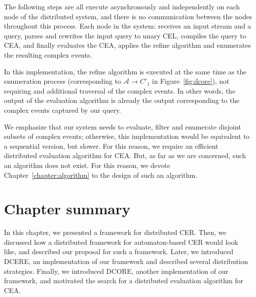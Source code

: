 The following steps are all execute asynchronously and independently on each node of the distributed system, and there is no communication between the nodes throughout this process. Each node in the system: receives an input stream and a query, parses and rewrites the input query to unary CEL, compiles the query to CEA, and finally evaluates the CEA, applies the refine algorithm and enumerates the resulting complex events.

In this implementation, the refine algorithm is executed at the same time as the enumeration process (corresponding to $\mathcal{A} \to C'_{1}$ in Figure~\ref{fig:dcore}), not requiring and additional traversal of the complex events. In other words, the output of the evaluation algorithm is already the output corresponding to the complex events captured by our query.

We emphasize that our system needs to evaluate, filter and enumerate disjoint subsets of complex events; otherwise, this implementation would be equivalent to a sequential version, but slower. For this reason, we require an efficient distributed evaluation algorithm for CEA. But, as far as we are concerned, such an algorithm does not exist. For this reason, we devote Chapter~\ref{chapter:algorithm} to the design of such an algorithm.

\section{Chapter summary}

In this chapter, we presented a framework for distributed CER. Then, we discussed how a distributed framework for automaton-based CER would look like, and described our proposal for such a framework. Later, we introduced DCERE, an implementation of our framework and described several distribution strategies. Finally, we introduced DCORE, another implementation of our framework, and motivated the search for a distributed evaluation algorithm for CEA.
